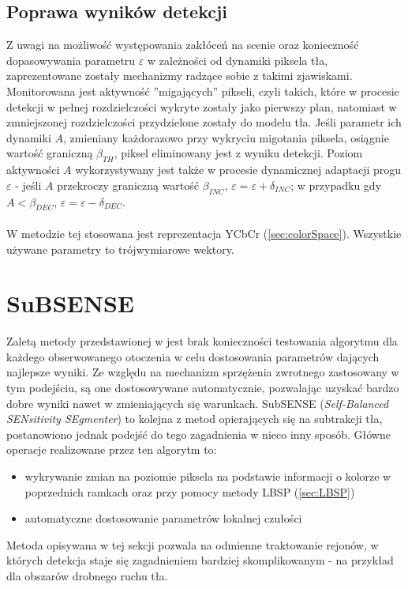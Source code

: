 \subsection{Poprawa wyników detekcji}
Z uwagi na możliwość występowania zakłóceń na scenie oraz konieczność dopasowywania parametru $\varepsilon$ w zależności od dynamiki piksela tła, zaprezentowane zostały mechanizmy radzące sobie z takimi zjawiskami. Monitorowana jest aktywność ''migających'' pikseli, czyli takich, które w procesie detekcji w pełnej rozdzielczości wykryte zostały jako pierwszy plan, natomiast w zmniejszonej rozdzielczości przydzielone zostały do modelu tła. Jeśli parametr ich dynamiki $A$, zmieniany każdorazowo przy wykryciu migotania piksela, osiągnie wartość graniczną $\beta_{TH}$, piksel eliminowany jest z wyniku detekcji. Poziom aktywności $A$ wykorzystywany jest także w procesie dynamicznej adaptacji progu $\varepsilon$ - jeśli $A$ przekroczy graniczną wartość $\beta_{INC}$, $\varepsilon = \varepsilon + \delta_{INC}$; w przypadku gdy $A<\beta_{DEC}$, $\varepsilon = \varepsilon - \delta_{DEC}$. \\
\paragraph{}
W metodzie tej stosowana jest reprezentacja YCbCr (\ref{sec:colorSpace}). Wszystkie używane parametry to trójwymiarowe wektory.

\section{SuBSENSE}
Zaletą metody przedstawionej w \cite{stflexible} jest brak konieczności testowania algorytmu dla każdego obserwowanego otoczenia w celu dostosowania parametrów dających najlepsze wyniki. Ze względu na mechanizm sprzężenia zwrotnego zastosowany w tym podejściu, są one dostosowywane automatycznie, pozwalając uzyskać bardzo dobre wyniki nawet w zmieniających się warunkach. SubSENSE (\textit{Self-Balanced SENsitivity SEgmenter}) to kolejna z metod opierających się na subtrakcji tła, postanowiono jednak podejść do tego zagadnienia w nieco inny sposób. Główne operacje realizowane przez ten algorytm to:
\begin{itemize}
\item wykrywanie zmian na poziomie piksela na podstawie informacji o kolorze w poprzednich ramkach oraz przy pomocy metody LBSP (\ref{sec:LBSP})
\item automatyczne dostosowanie parametrów lokalnej czułości
\end{itemize}
Metoda opisywana w tej sekcji pozwala na odmienne traktowanie rejonów, w których detekcja staje się zagadnieniem bardziej skomplikowanym - na przykład dla obszarów drobnego ruchu tła. 
